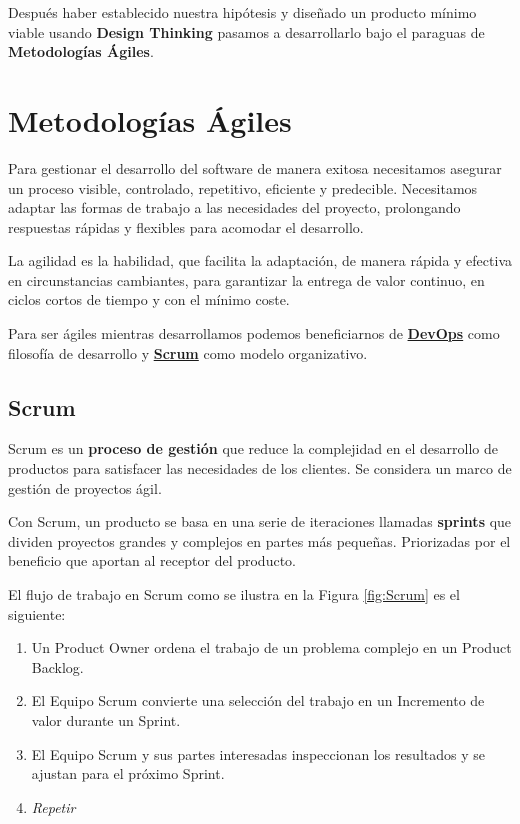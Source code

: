 \documentclass[12pt,twoside,titlepage]{report}
\begin{document}
Después haber establecido nuestra hipótesis y diseñado un producto mínimo viable usando \textbf{Design Thinking} pasamos a desarrollarlo bajo el paraguas de \textbf{Metodologías Ágiles}.

\chapter{Metodologías Ágiles}
\label{sec:agile}
Para gestionar el desarrollo del software de manera exitosa necesitamos asegurar un proceso visible, controlado, repetitivo, eficiente y predecible. Necesitamos adaptar las formas de trabajo a las necesidades del proyecto, prolongando respuestas rápidas y flexibles para acomodar el desarrollo.

La agilidad es la habilidad, que facilita la adaptación, de manera rápida y efectiva en circunstancias cambiantes, para garantizar la entrega de valor continuo, en ciclos cortos de tiempo y con el mínimo coste. \cite{manifiestoAgil} %

Para ser ágiles mientras desarrollamos podemos beneficiarnos de \hyperref[sec:DevOps]{\textbf{DevOps}} como filosofía de desarrollo y \hyperref[sec:Scrum]{\textbf{Scrum}} como modelo organizativo.
\cite{agile}

\section{Scrum}
\label{sec:Scrum}

Scrum es un \textbf{proceso de gestión} que reduce la complejidad en el desarrollo de productos para satisfacer las necesidades de los clientes. Se considera un marco de gestión de proyectos ágil.

Con Scrum, un producto se basa en una serie de iteraciones llamadas \textbf{sprints} que dividen proyectos grandes y complejos en partes más pequeñas. Priorizadas por el beneficio que aportan al receptor del producto.
\cite{scrum1}

El flujo de trabajo en Scrum como se ilustra en la Figura \ref{fig:Scrum} es el siguiente:

\begin{enumerate}
    \item Un Product Owner ordena el trabajo de un problema complejo en un Product Backlog.
    \item El Equipo Scrum convierte una selección del trabajo en un Incremento de valor durante un Sprint.
    \item El Equipo Scrum y sus partes interesadas inspeccionan los resultados y se ajustan para el próximo Sprint.
    \item \textit{Repetir}
\end{enumerate}
\end{document}
